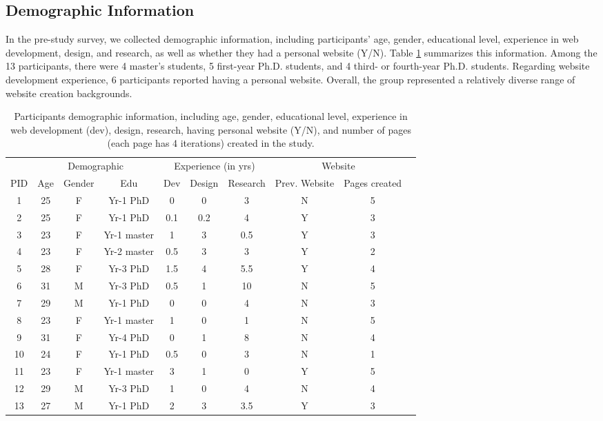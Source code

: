 \subsection{Demographic Information}

In the pre-study survey, we collected demographic information, including participants' age, gender, educational level, experience in web development, design, and research, as well as whether they had a personal website (Y/N). Table \ref{tab:demographic} summarizes this information. Among the 13 participants, there were 4 master's students, 5 first-year Ph.D. students, and 4 third- or fourth-year Ph.D. students. Regarding website development experience, 6 participants reported having a personal website. Overall, the group represented a relatively diverse range of website creation backgrounds.

\begin{table}[h!]
\centering
\begin{tabular}{cccccccccc}
\toprule
& \multicolumn{3}{c}{Demographic} & \multicolumn{3}{c}{Experience (in yrs)} & \multicolumn{2}{c}{Website} \\
PID & Age & Gender & Edu & Dev & Design & Research & Prev. Website & Pages created \\
\midrule
1 & 25 & F & Yr-1 PhD & 0 & 0 & 3 & N & 5 \\
2 & 25 & F & Yr-1 PhD & 0.1 & 0.2 & 4 & Y & 3 \\
3 & 23 & F & Yr-1 master & 1 & 3 & 0.5 & Y & 3 \\
4 & 23 & F & Yr-2 master & 0.5 & 3 & 3 & Y & 2 \\
5 & 28 & F & Yr-3 PhD & 1.5 & 4 & 5.5 & Y & 4 \\
6 & 31 & M & Yr-3 PhD & 0.5 & 1 & 10 & N & 5 \\
7 & 29 & M & Yr-1 PhD & 0 & 0 & 4 & N & 3 \\
8 & 23 & F & Yr-1 master & 1 & 0 & 1 & N & 5 \\
9 & 31 & F & Yr-4 PhD & 0 & 1 & 8 & N & 4 \\
10 & 24 & F & Yr-1 PhD & 0.5 & 0 & 3 & N & 1 \\
11 & 23 & F & Yr-1 master & 3 & 1 & 0 & Y & 5 \\
12 & 29 & M & Yr-3 PhD & 1 & 0 & 4 & N & 4 \\
13 & 27 & M & Yr-1 PhD & 2 & 3 & 3.5 & Y & 3 \\
\bottomrule
\end{tabular}
\caption{Participants demographic information, including age, gender, educational level, experience in web development (dev), design, research, having personal website (Y/N), and number of pages (each page has 4 iterations) created in the study.}
\label{tab:demographic}
\end{table}



